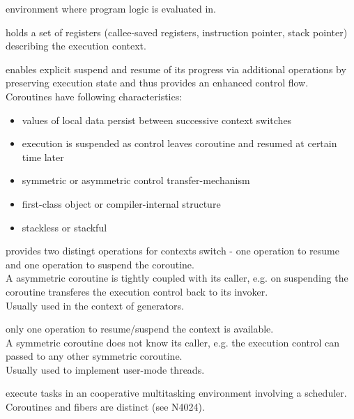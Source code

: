 
environment where program logic is evaluated in.

holds a set of registers (callee-saved registers, instruction pointer, stack
pointer) describing the execution context.

enables explicit suspend and resume of its progress via additional operations by
preserving execution state and thus provides an enhanced control flow.\\
Coroutines have following characteristics\cite{N3985}:
\begin{itemize}
    \item values of local data persist between successive context switches
    \item execution is suspended as control leaves coroutine and resumed at
          certain time later
    \item symmetric or asymmetric control transfer-mechanism
    \item first-class object or compiler-internal structure
    \item stackless or stackful
\end{itemize}

provides two distingt operations for contexts switch - one operation to
resume and one operation to suspend the coroutine.\\
A asymmetric coroutine is tightly coupled with its caller, e.g. on suspending
the coroutine transferes the execution control back to its invoker.\\
Usually used in the context of generators.

only one operation to resume/suspend the context is available.\\
A symmetric coroutine does not know its caller, e.g. the execution control can
passed to any other symmetric coroutine.\\
Usually used to implement user-mode threads.

execute tasks in an cooperative multitasking environment involving a
scheduler. Coroutines and fibers are distinct (see N4024\cite{N4024}).

